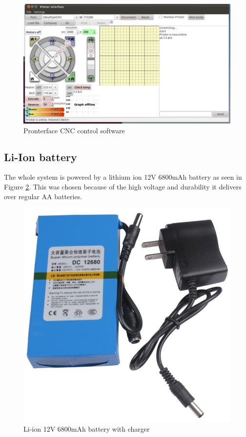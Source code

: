 			\begin{figure}[H]
					\centering
					\includegraphics[scale=1.4]{images/ProjectComponents/pronterface.png}
					\caption{Pronterface CNC control software}
					\label{battery}
			\end{figure}
			\bigskip





\newpage
\subsection{Li-Ion battery}

	The whole system is powered by a lithium ion 12V 6800mAh battery as seen in Figure \ref{battery}. This was chosen because of the high voltage and durability it delivers over regular AA batteries.

		\begin{figure}[H]
				\centering
				\includegraphics[scale=0.25]{images/ProjectComponents/battery.jpg}
				\caption{Li-ion 12V 6800mAh battery with charger}
				\label{battery}
		\end{figure}
		\bigskip

